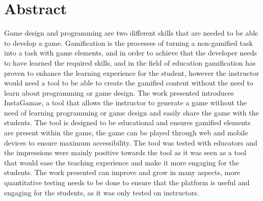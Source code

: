 \chapter*{Abstract}
\label{chap:abstract}

Game design and programming are two different skills that are needed to be able to develop a game. Gamification is the processes of turning a non-gamified task into a task with game elements, and in order to achieve that the developer needs to have learned the required skills, and in the field of education gamification has proven to enhance the learning experience for the student, however the instructor would need a tool to be able to create the gamified content without the need to learn about programming or game design. The work presented introduces InstaGamae, a tool that allows the instructor to generate a game without the need of learning programming or game design and easily share the game with the students. The tool is designed to be educational and ensures gamified elements are present within the game, the game can be played through web and mobile devices to ensure maximum accessibility. The tool was tested with educators and the impressions were mainly positive towards the tool as it was seen as a tool that would ease the teaching experience and make it more engaging for the students. The work presented can improve and grow in many aspects, more quantitative testing needs to be done to ensure that the platform is useful and engaging for the students, as it was only tested on instructors.